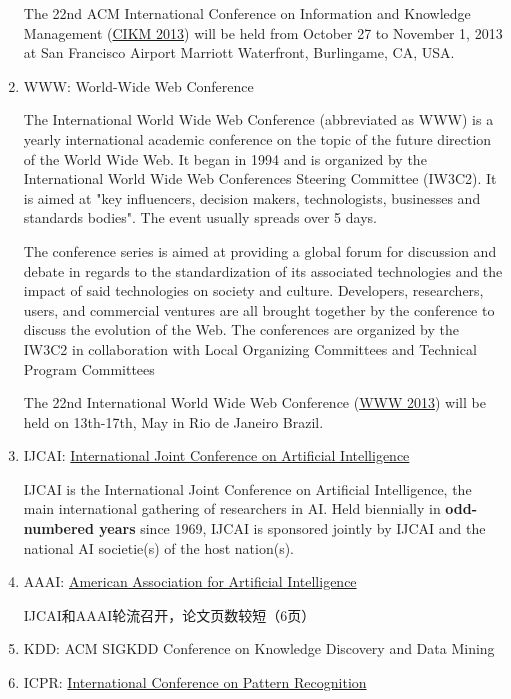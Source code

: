 \begin{enumerate}[（1）]
The 22nd ACM International Conference on Information and Knowledge Management (\href{http://www.cikm2013.org/}{CIKM 2013}) will be held from October 27 to November 1, 2013 at San Francisco Airport Marriott Waterfront, Burlingame, CA, USA.

\item WWW: World-Wide Web Conference

The International World Wide Web Conference (abbreviated as WWW) is a yearly international academic conference on the topic of the future direction of the World Wide Web. It began in 1994 and is organized by the International World Wide Web Conferences Steering Committee (IW3C2). It is aimed at "key influencers, decision makers, technologists, businesses and standards bodies". The event usually spreads over 5 days.

The conference series is aimed at providing a global forum for discussion and debate in regards to the standardization of its associated technologies and the impact of said technologies on society and culture. Developers, researchers, users, and commercial ventures are all brought together by the conference to discuss the evolution of the Web. The conferences are organized by the IW3C2 in collaboration with Local Organizing Committees and Technical Program Committees

The 22nd International World Wide Web Conference (\href{http://www2013.org/}{WWW 2013}) will be held on 13th-17th, May in Rio de Janeiro Brazil.
\item IJCAI: \href{http://ijcai.org/}{International Joint Conference on Artificial Intelligence}

IJCAI is the International Joint Conference on Artificial Intelligence, the main international gathering of researchers in AI. Held biennially in \textbf{odd-numbered years} since 1969, IJCAI is sponsored jointly by IJCAI and the national AI societie(s) of the host nation(s).

\item AAAI: \href{http://www.aaai.org/Conferences/AAAI/aaai.php}{American Association for Artificial Intelligence}

IJCAI和AAAI轮流召开，论文页数较短（6页）

\item KDD: ACM SIGKDD Conference on Knowledge Discovery and Data Mining

\item ICPR: \href{http://www.icpr2014.org/tracks.htm}{International Conference on Pattern Recognition}
\end{enumerate}

